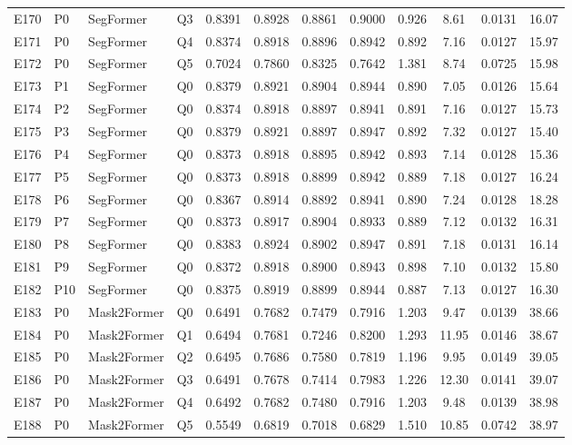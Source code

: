 \begin{longtable}{@{}lllllccccccc@{}}
E170 & P0 & SegFormer & Q3 & 0.8391 & 0.8928 & 0.8861 & 0.9000 & 0.926 & 8.61 & 0.0131 & 16.07 \\
E171 & P0 & SegFormer & Q4 & 0.8374 & 0.8918 & 0.8896 & 0.8942 & 0.892 & 7.16 & 0.0127 & 15.97 \\
E172 & P0 & SegFormer & Q5 & 0.7024 & 0.7860 & 0.8325 & 0.7642 & 1.381 & 8.74 & 0.0725 & 15.98 \\
E173 & P1 & SegFormer & Q0 & 0.8379 & 0.8921 & 0.8904 & 0.8944 & 0.890 & 7.05 & 0.0126 & 15.64 \\
E174 & P2 & SegFormer & Q0 & 0.8374 & 0.8918 & 0.8897 & 0.8941 & 0.891 & 7.16 & 0.0127 & 15.73 \\
E175 & P3 & SegFormer & Q0 & 0.8379 & 0.8921 & 0.8897 & 0.8947 & 0.892 & 7.32 & 0.0127 & 15.40 \\
E176 & P4 & SegFormer & Q0 & 0.8373 & 0.8918 & 0.8895 & 0.8942 & 0.893 & 7.14 & 0.0128 & 15.36 \\
E177 & P5 & SegFormer & Q0 & 0.8373 & 0.8918 & 0.8899 & 0.8942 & 0.889 & 7.18 & 0.0127 & 16.24 \\
E178 & P6 & SegFormer & Q0 & 0.8367 & 0.8914 & 0.8892 & 0.8941 & 0.890 & 7.24 & 0.0128 & 18.28 \\
E179 & P7 & SegFormer & Q0 & 0.8373 & 0.8917 & 0.8904 & 0.8933 & 0.889 & 7.12 & 0.0132 & 16.31 \\
E180 & P8 & SegFormer & Q0 & 0.8383 & 0.8924 & 0.8902 & 0.8947 & 0.891 & 7.18 & 0.0131 & 16.14 \\
E181 & P9 & SegFormer & Q0 & 0.8372 & 0.8918 & 0.8900 & 0.8943 & 0.898 & 7.10 & 0.0132 & 15.80 \\
E182 & P10 & SegFormer & Q0 & 0.8375 & 0.8919 & 0.8899 & 0.8944 & 0.887 & 7.13 & 0.0127 & 16.30 \\
E183 & P0 & Mask2Former & Q0 & 0.6491 & 0.7682 & 0.7479 & 0.7916 & 1.203 & 9.47 & 0.0139 & 38.66 \\
E184 & P0 & Mask2Former & Q1 & 0.6494 & 0.7681 & 0.7246 & 0.8200 & 1.293 & 11.95 & 0.0146 & 38.67 \\
E185 & P0 & Mask2Former & Q2 & 0.6495 & 0.7686 & 0.7580 & 0.7819 & 1.196 & 9.95 & 0.0149 & 39.05 \\
E186 & P0 & Mask2Former & Q3 & 0.6491 & 0.7678 & 0.7414 & 0.7983 & 1.226 & 12.30 & 0.0141 & 39.07 \\
E187 & P0 & Mask2Former & Q4 & 0.6492 & 0.7682 & 0.7480 & 0.7916 & 1.203 & 9.48 & 0.0139 & 38.98 \\
E188 & P0 & Mask2Former & Q5 & 0.5549 & 0.6819 & 0.7018 & 0.6829 & 1.510 & 10.85 & 0.0742 & 38.97 \\

\end{longtable}
